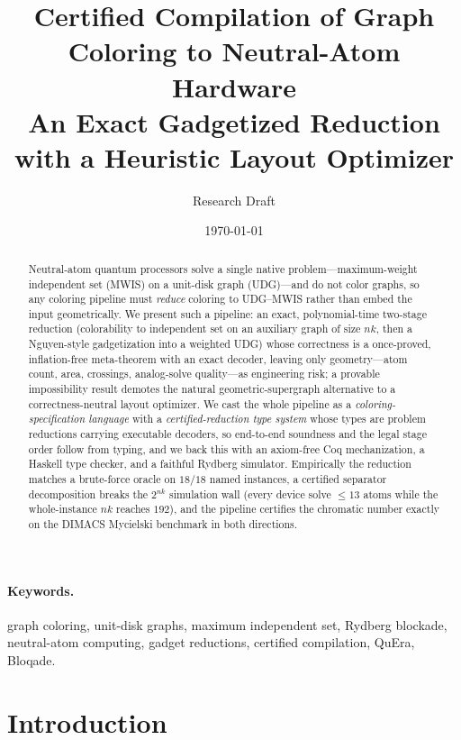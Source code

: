 \documentclass[11pt]{article}
\title{%
  \textbf{Certified Compilation of Graph Coloring to Neutral-Atom Hardware}\\[0.45em]
  \large An Exact Gadgetized Reduction with a Heuristic Layout Optimizer}
\author{Research Draft}
\date{\today}
\theoremstyle{definition}
\theoremstyle{remark}
\begin{document}
\maketitle

\begin{abstract}
Neutral-atom quantum processors solve a single native problem---maximum-weight
independent set (MWIS) on a unit-disk graph (UDG)---and do not color graphs, so any
coloring pipeline must \emph{reduce} coloring to UDG--MWIS rather than embed the
input geometrically. We present such a pipeline: an exact, polynomial-time two-stage
reduction (colorability to independent set on an auxiliary graph of size $nk$, then
a Nguyen-style gadgetization into a weighted UDG) whose correctness is a once-proved,
inflation-free meta-theorem with an exact decoder, leaving only geometry---atom
count, area, crossings, analog-solve quality---as engineering risk; a provable
impossibility result demotes the natural geometric-supergraph alternative to a
correctness-neutral layout optimizer. We cast the whole pipeline as a
\emph{coloring-specification language} with a \emph{certified-reduction type system}
whose types are problem reductions carrying executable decoders, so end-to-end
soundness and the legal stage order follow from typing, and we back this with an
axiom-free Coq mechanization, a Haskell type checker, and a faithful Rydberg
simulator. Empirically the reduction matches a brute-force oracle on $18/18$ named
instances, a certified separator decomposition breaks the $2^{nk}$ simulation wall
(every device solve $\le 13$ atoms while the whole-instance $nk$ reaches $192$), and
the pipeline certifies the chromatic number exactly on the DIMACS Mycielski
benchmark in both directions.
\end{abstract}

\paragraph{Keywords.} graph coloring, unit-disk graphs, maximum independent set,
Rydberg blockade, neutral-atom computing, gadget reductions, certified
compilation, QuEra, Bloqade.

\section{Introduction}
\label{sec:intro}
\end{document}
